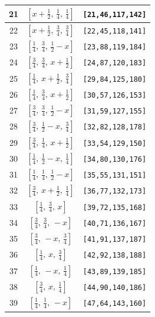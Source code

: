 \documentclass[fleqn,8pt]{jsarticle}
\begin{document}
\begin{longtable}{ccc}
21 & $\left[ x + \frac{1}{2},\, \frac{1}{4},\, \frac{1}{4} \right]$ & {\tt [21,46,117,142]} \\ \hline
22 & $\left[ x + \frac{1}{2},\, \frac{3}{4},\, \frac{3}{4} \right]$ & {\tt [22,45,118,141]} \\ \hline
23 & $\left[ \frac{1}{4},\, \frac{3}{4},\, \frac{1}{2} - x \right]$ & {\tt [23,88,119,184]} \\ \hline
24 & $\left[ \frac{3}{4},\, \frac{3}{4},\, x + \frac{1}{2} \right]$ & {\tt [24,87,120,183]} \\ \hline
25 & $\left[ \frac{1}{4},\, x + \frac{1}{2},\, \frac{3}{4} \right]$ & {\tt [29,84,125,180]} \\ \hline
26 & $\left[ \frac{1}{4},\, \frac{3}{4},\, x + \frac{1}{2} \right]$ & {\tt [30,57,126,153]} \\ \hline
27 & $\left[ \frac{3}{4},\, \frac{3}{4},\, \frac{1}{2} - x \right]$ & {\tt [31,59,127,155]} \\ \hline
28 & $\left[ \frac{3}{4},\, \frac{1}{2} - x,\, \frac{3}{4} \right]$ & {\tt [32,82,128,178]} \\ \hline
29 & $\left[ \frac{3}{4},\, \frac{1}{4},\, x + \frac{1}{2} \right]$ & {\tt [33,54,129,150]} \\ \hline
30 & $\left[ \frac{1}{4},\, \frac{1}{2} - x,\, \frac{1}{4} \right]$ & {\tt [34,80,130,176]} \\ \hline
31 & $\left[ \frac{1}{4},\, \frac{1}{4},\, \frac{1}{2} - x \right]$ & {\tt [35,55,131,151]} \\ \hline
32 & $\left[ \frac{3}{4},\, x + \frac{1}{2},\, \frac{1}{4} \right]$ & {\tt [36,77,132,173]} \\ \hline
33 & $\left[ \frac{1}{4},\, \frac{3}{4},\, x \right]$ & {\tt [39,72,135,168]} \\ \hline
34 & $\left[ \frac{3}{4},\, \frac{3}{4},\, - x \right]$ & {\tt [40,71,136,167]} \\ \hline
35 & $\left[ \frac{3}{4},\, - x,\, \frac{3}{4} \right]$ & {\tt [41,91,137,187]} \\ \hline
36 & $\left[ \frac{1}{4},\, x,\, \frac{3}{4} \right]$ & {\tt [42,92,138,188]} \\ \hline
37 & $\left[ \frac{1}{4},\, - x,\, \frac{1}{4} \right]$ & {\tt [43,89,139,185]} \\ \hline
38 & $\left[ \frac{3}{4},\, x,\, \frac{1}{4} \right]$ & {\tt [44,90,140,186]} \\ \hline
39 & $\left[ \frac{1}{4},\, \frac{1}{4},\, - x \right]$ & {\tt [47,64,143,160]} \\ \hline

\end{longtable}
\end{document}
